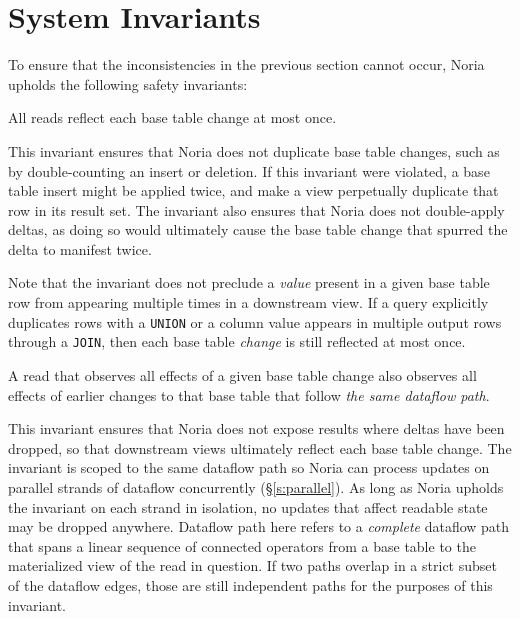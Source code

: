 \section{System Invariants}
\label{s:invariants}

To ensure that the inconsistencies in the previous section cannot occur, Noria
upholds the following safety invariants:

\begin{invariant}
  \label{i:no-spurious}
  All reads reflect each base table change at most once.
\end{invariant}

This invariant ensures that Noria does not duplicate base table changes, such as
by double-counting an insert or deletion. If this invariant were violated, a
base table insert might be applied twice, and make a view perpetually duplicate
that row in its result set. The invariant also ensures that Noria does not
double-apply deltas, as doing so would ultimately cause the base table change
that spurred the delta to manifest twice.

Note that the invariant does not preclude a \emph{value} present in a given base
table row from appearing multiple times in a downstream view. If a query
explicitly duplicates rows with a \texttt{UNION} or a column value appears in
multiple output rows through a \texttt{JOIN}, then each base table \emph{change}
is still reflected at most once.


\begin{invariant}
  \label{i:no-holes}
  A read that observes all effects of a given base table change also observes
  all effects of earlier changes to that base table that follow \emph{the same
  dataflow path}.
\end{invariant}

This invariant ensures that Noria does not expose results where deltas have been
dropped, so that downstream views ultimately reflect each base table change. The
invariant is scoped to the same dataflow path so Noria can process updates on
parallel strands of dataflow concurrently (\S\ref{s:parallel}). As long as Noria
upholds the invariant on each strand in isolation, no updates that affect
readable state may be dropped anywhere. Dataflow path here refers to
a \emph{complete} dataflow path that spans a linear sequence of connected
operators from a base table to the materialized view of the read in question. If
two paths overlap in a strict subset of the dataflow edges, those are still
independent paths for the purposes of this invariant.

